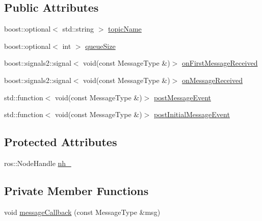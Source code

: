 \subsection*{Public Attributes}
\begin{DoxyCompactItemize}
\item 
boost\+::optional$<$ std\+::string $>$ \hyperlink{classsmacc_1_1client__bases_1_1SmaccSubscriberClient_aeadf21a09412c6c9488e5acd50fb4f40}{topic\+Name}
\item 
boost\+::optional$<$ int $>$ \hyperlink{classsmacc_1_1client__bases_1_1SmaccSubscriberClient_a67f03f081d83476cdb7fd631b6aba450}{queue\+Size}
\item 
boost\+::signals2\+::signal$<$ void(const Message\+Type \&)$>$ \hyperlink{classsmacc_1_1client__bases_1_1SmaccSubscriberClient_adaa280a70b97bd2c53d05b5712cbd701}{on\+First\+Message\+Received}
\item 
boost\+::signals2\+::signal$<$ void(const Message\+Type \&)$>$ \hyperlink{classsmacc_1_1client__bases_1_1SmaccSubscriberClient_a2703867f1ee638c5fffa680f93cee29a}{on\+Message\+Received}
\item 
std\+::function$<$ void(const Message\+Type \&)$>$ \hyperlink{classsmacc_1_1client__bases_1_1SmaccSubscriberClient_ad71ae0708e8a3ea321de985076d8b0ac}{post\+Message\+Event}
\item 
std\+::function$<$ void(const Message\+Type \&)$>$ \hyperlink{classsmacc_1_1client__bases_1_1SmaccSubscriberClient_ac184f4c0a6e924ceb9eecc71d6252106}{post\+Initial\+Message\+Event}
\end{DoxyCompactItemize}
\subsection*{Protected Attributes}
\begin{DoxyCompactItemize}
\item 
ros\+::\+Node\+Handle \hyperlink{classsmacc_1_1client__bases_1_1SmaccSubscriberClient_a401d2476e89e27acc2e905acd701f053}{nh\+\_\+}
\end{DoxyCompactItemize}
\subsection*{Private Member Functions}
\begin{DoxyCompactItemize}
\item 
void \hyperlink{classsmacc_1_1client__bases_1_1SmaccSubscriberClient_acf85b80439aff5cf2bfa0649e9e45654}{message\+Callback} (const Message\+Type \&msg)
\end{DoxyCompactItemize}
